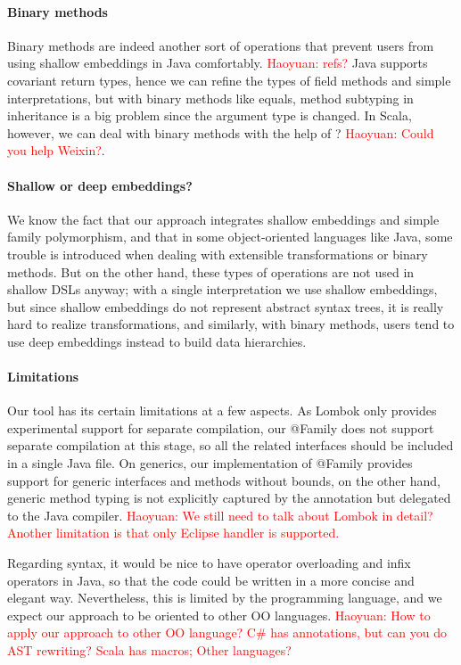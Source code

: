 \paragraph{Binary methods} Binary methods are indeed another sort of operations that prevent users from using shallow embeddings in Java
comfortably. \textcolor{red}{Haoyuan: refs?} Java supports covariant return types, hence we can refine the types of field methods and
simple interpretations, but with binary methods like \textsf{equals}, method subtyping in inheritance is a big problem since the argument type
is changed. In Scala, however, we can deal with binary methods with the help of ? \textcolor{red}{Haoyuan: Could you help Weixin?}.

\paragraph{Shallow or deep embeddings?} We know the fact that our approach integrates shallow embeddings and simple family polymorphism, and that in some object-oriented languages like Java,
some trouble is introduced when dealing with extensible transformations or binary methods. But on the other hand, these types of operations are not used in
shallow DSLs anyway; with a single interpretation we use shallow embeddings, but since shallow embeddings do not represent abstract syntax trees,
it is really hard to realize transformations, and similarly, with binary methods, users tend to use deep embeddings instead to build data hierarchies.

\paragraph{Limitations} Our tool has its certain limitations at a few aspects. As Lombok only provides experimental support
for separate compilation, our \textsf{@Family} does not support separate compilation at this stage, so all the related
interfaces should be included in a single Java file. On generics, our implementation of \textsf{@Family} provides support
for generic interfaces and methods without bounds, on the other hand, generic method typing is not explicitly captured
by the annotation but delegated to the Java compiler. \textcolor{red}{Haoyuan: We still need to talk about Lombok in detail?
Another limitation is that only Eclipse handler is supported.}

Regarding syntax, it would be nice to have operator overloading and infix operators in Java, so that the code could be
written in a more concise and elegant way. Nevertheless, this is limited by the programming language, and we expect our approach to be oriented to
other OO languages. \textcolor{red}{Haoyuan: How to apply our approach to other OO language? C\# has annotations, but can you do AST rewriting? Scala has macros;  Other languages?}

